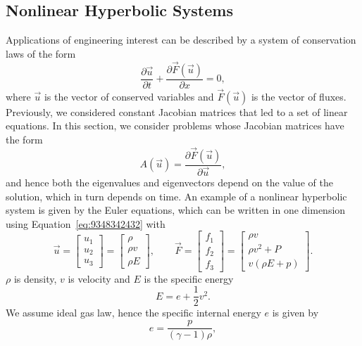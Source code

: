 \subsection{Nonlinear Hyperbolic Systems}
Applications of engineering interest can be described by a system of conservation laws of the form
\begin{equation}
	\frac{\partial \vec u}{\partial t} + \frac{\partial \vec F (\vec u)}{\partial x} = 0,
	\label{eq:9348342432}
\end{equation}
where $\vec u$ is the vector of conserved variables and $\vec F(\vec u)$ is the vector of fluxes. Previously, we considered constant Jacobian matrices that led to a set of linear equations. In this section, we consider problems whose Jacobian matrices have the form 
\begin{equation}
	A(\vec u) = \frac{\partial \vec F(\vec u)}{\partial \vec u},
\end{equation}
and hence both the eigenvalues and eigenvectors depend on the value of the solution, which in turn depends on time. An example of a nonlinear hyperbolic system is given by the Euler equations, which can be written in one dimension using Equation~\ref{eq:9348342432} with
\begin{equation}
	\vec u = \begin{bmatrix}
		u_1 \\ u_2 \\ u_3
	\end{bmatrix}
	= 
	\begin{bmatrix}
		\rho \\ \rho v \\ \rho E
	\end{bmatrix},
	\quad\quad
	\vec F = 
	\begin{bmatrix}
		f_1 \\ f_2 \\ f_3
	\end{bmatrix}
	= 
	\begin{bmatrix}
		\rho v \\ \rho v^2 + P \\ v(\rho E + p)
	\end{bmatrix}.
\end{equation}
$\rho$ is density, $v$ is velocity and $E$ is the specific energy
\begin{equation}
E = e + \frac{1}{2}v^2.
\end{equation}
We assume ideal gas law, hence the specific internal energy $e$ is given by
\begin{equation}
	e = \frac{p}{(\gamma-1)\rho},
\end{equation}
